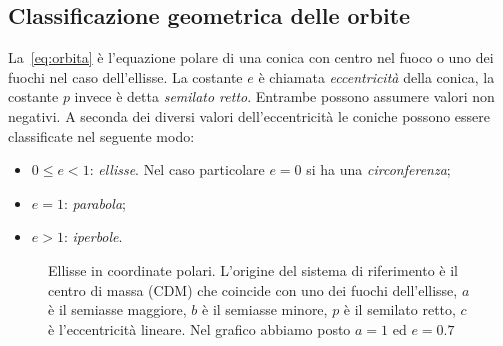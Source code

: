\subsection{Classificazione geometrica delle orbite}
\label{sec:class-geom-orbite}

La~\eqref{eq:orbita} è l'equazione polare di una conica con centro nel fuoco o
uno dei fuochi nel caso dell'ellisse. La costante $e$ è chiamata
\emph{eccentricità} della conica, la costante $p$ invece è detta \emph{semilato
  retto}. Entrambe possono assumere valori non negativi. A seconda dei diversi
valori dell'eccentricità le coniche possono essere classificate nel seguente
modo:
\begin{itemize}
\item $0\leq e<1$: \emph{ellisse}. Nel caso particolare $e=0$ si ha una
  \emph{circonferenza};
\item $e=1$: \emph{parabola};
\item $e>1$: \emph{iperbole}.
\end{itemize}
\begin{figure}
  \centering
  
  \caption[Ellisse in coordinate polari]{Ellisse in coordinate polari. L'origine
    del sistema di riferimento è il centro di massa (CDM) che coincide con uno
    dei fuochi dell'ellisse, $a$ è il semiasse maggiore, $b$ è il semiasse
    minore, $p$ è il semilato retto, $c$ è l'eccentricità lineare. Nel grafico
    abbiamo posto $a=1$ ed $e=0.7$}
  \label{fig:ellisse}
\end{figure}

